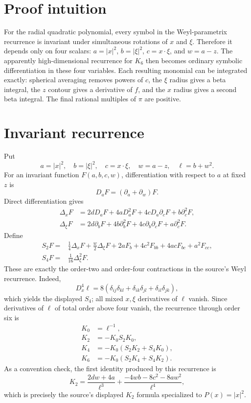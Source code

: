 \documentclass[11pt]{article}
\begin{document}
\section{Proof intuition}

For the radial quadratic polynomial, every symbol in the Weyl-parametrix
recurrence is invariant under simultaneous rotations of $x$ and $\xi$.
Therefore it depends only on four scalars:
$a=|x|^2$, $b=|\xi|^2$, $c=x\cdot\xi$, and $w=a-z$.  The apparently
high-dimensional recurrence for $K_6$ then becomes ordinary symbolic
differentiation in these four variables.  Each resulting monomial can be
integrated exactly: spherical averaging removes powers of $c$, the $\xi$
radius gives a beta integral, the $z$ contour gives a derivative of $f$, and
the $x$ radius gives a second beta integral.  The final rational multiples of
$\pi$ are positive.

\section{Invariant recurrence}

Put
\[
 a=|x|^2,\quad b=|\xi|^2,\quad c=x\cdot\xi,\quad w=a-z,
 \quad \ell=b+w^2.
\]
For an invariant function $F(a,b,c,w)$, differentiation with respect to $a$
at fixed $z$ is
\[
 D_aF=(\partial_a+\partial_w)F.
\]
Direct differentiation gives
\begin{align*}
 \Delta_xF&=2dD_aF+4aD_a^2F+4cD_a\partial_cF+b\partial_c^2F,\\
 \Delta_\xi F&=2d\partial_bF+4b\partial_b^2F
                 +4c\partial_b\partial_cF+a\partial_c^2F.
\end{align*}
Define
\begin{align*}
 S_2F={}&\frac14\Delta_xF+\frac w2\Delta_\xi F
     +2aF_b+4c^2F_{bb}+4acF_{bc}+a^2F_{cc},\\
 S_4F={}&\frac1{16}\Delta_\xi^2F.
\end{align*}
These are exactly the order-two and order-four contractions in the source's
Weyl recurrence.  Indeed,
\[
 D_x^4\ell=8(\delta_{ij}\delta_{kl}+\delta_{ik}\delta_{jl}
                    +\delta_{il}\delta_{jk}),
\]
which yields the displayed $S_4$; all mixed $x,\xi$ derivatives of $\ell$
vanish.  Since derivatives of $\ell$ of total order above four vanish, the
recurrence through order six is
\begin{align*}
 K_0&=\ell^{-1},\\
 K_2&=-K_0S_2K_0,\\
 K_4&=-K_0(S_2K_2+S_4K_0),\\
 K_6&=-K_0(S_2K_4+S_4K_2).
\end{align*}
As a convention check, the first identity produced by this recurrence is
\[
K_2=\frac{2dw+4a}{\ell^3}
 +\frac{-4wb-8c^2-8aw^2}{\ell^4},
\]
which is precisely the source's displayed $K_2$ formula specialized to
$P(x)=|x|^2$.
\end{document}

